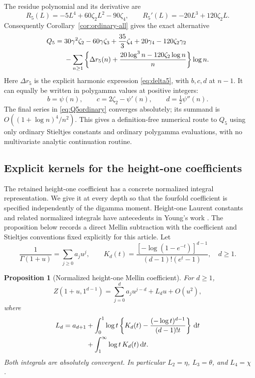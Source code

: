 \documentclass[11pt,a4paper]{article}
\numberwithin{equation}{section}
\newtheorem{proposition}[theorem]{Proposition}
\theoremstyle{definition}
\theoremstyle{remark}
\newcommand{\dd}{\mathrm d}
\begin{document}
The residue polynomial and its derivative are
\[
 R_5(L)=-5L^4+60\zeta_2L^2-90\zeta_4,
 \qquad R_5'(L)=-20L^3+120\zeta_2L.
\]
Consequently Corollary~\ref{cor:ordinary-all} gives the exact alternative
\begin{align}
 Q_5={}&30\gamma^2\zeta_2-60\gamma\zeta_3+\frac{35}{3}\zeta_4
                   +20\gamma_4-120\zeta_2\gamma_2
 \notag\\
 &-\sum_{n\ge1}
  \left\{\Delta r_5(n)
           +\frac{20\log^3n-120\zeta_2\log n}{n}\right\}\log n.
 \label{eq:Q5ordinary}
\end{align}
Here $\Delta r_5$ is the explicit harmonic expression
\eqref{eq:delta5}, with $b,c,d$ at $n-1$.
It can equally be written in polygamma values at positive integers:
\begin{equation}
 b=\psi(n),\qquad c=2\zeta_2-\psi'(n),\qquad
 d=\tfrac12\psi''(n).
 \label{eq:polygamma5}
\end{equation}
The final series in \eqref{eq:Q5ordinary} converges absolutely;
its summand is $O((1+\log n)^4/n^2)$.
This gives a definition-free numerical route to $Q_5$ using only
ordinary Stieltjes constants and ordinary polygamma evaluations,
with no multivariate analytic continuation routine.

\subsection{Explicit kernels for the height-one coefficients}
\label{subsec:heightkernel}

The retained height-one coefficient has a concrete normalized
integral representation.  We give it at every depth so that the
fourfold coefficient is specified independently of the digamma moment.
Height-one Laurent constants and related normalized integrals have
antecedents in Young's work \cite[Section~4]{Young}.  The proposition
below records a direct Mellin subtraction with the coefficient and
Stieltjes conventions fixed explicitly for this article.
Let
\begin{equation}
 \frac1{\Gamma(1+u)}=\sum_{j\ge0}a_ju^j,\qquad
 K_d(t)=\frac{[-\log(1-e^{-t})]^{d-1}}
                       {(d-1)!(e^t-1)},\quad d\ge1.
 \label{eq:Kd}
\end{equation}

\begin{proposition}[Normalized height-one Mellin coefficient]
\label{prop:heightkernel}
For $d\ge1$,
\begin{equation}
 Z(1+u,1^{d-1})=\sum_{j=0}^d a_ju^{j-d}+L_du+O(u^2),
 \label{eq:heightLaurent}
\end{equation}
where
\begin{align}
 L_d=a_{d+1}
 &+\int_0^1\log t\left\{K_d(t)
                  -\frac{(-\log t)^{d-1}}{(d-1)!t}\right\}\,\dd t
 \notag\\
 &+\int_1^\infty\log t\,K_d(t)\,\dd t.
 \label{eq:heightkernel}
\end{align}
Both integrals are absolutely convergent.  In particular
$L_2=\eta$, $L_3=\theta$, and $L_4=\chi$.
\end{proposition}
\end{document}
